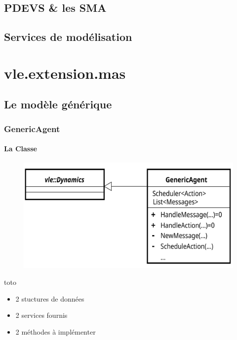 \documentclass[xetex, compress, table, svgnames]{beamer}
\begin{document}
\subsection{PDEVS \& les SMA}

\subsection{Services de modélisation}

\section{vle.extension.mas}

\subsection{Le modèle générique}

\begin{frame}
  \frametitle{GenericAgent}
  \framesubtitle{La Classe}
  \begin{figure}[h]
    \includegraphics[width=.7\textwidth]{fig/GenericAgentClassDiagram}
  \end{figure}
  \begin{block}{toto}
    \begin{itemize}
    \item 2 stuctures de données
    \item 2 services fournis
    \item 2 méthodes à implémenter
    \end{itemize}
  \end{block}
\end{frame}
\end{document}
